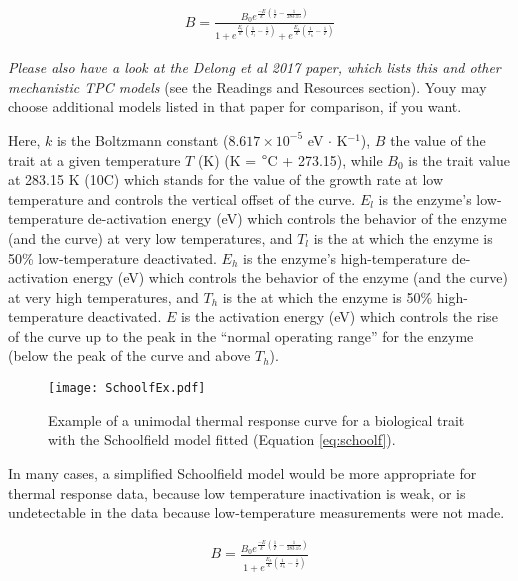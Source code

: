 \begin{equation} \label{eq:schoolf}
	\begin{aligned}
	  B = \frac{B_0 e^{\frac{-E}{k} (\frac{1}{T} - \frac{1}{283.15})}}
    { 1 + e^{\frac{E_l}{k} (\frac{1}{T_l} - \frac{1}{T})} + 
    e^{\frac{E_h}{k} (\frac{1}{T_h} - \frac{1}{T})}}
	\end{aligned}
\end{equation}

{\it Please also have a look at the Delong et al 2017 paper, which lists 
this and other mechanistic TPC models} (see the Readings and 
Resources section). Youy may choose additional models listed in that 
paper for comparison, if you want.

Here, $k$ is the Boltzmann constant ($8.617 \times 10^{-5}$ eV $\cdot$ 
K$^{-1}$), $B$ the value of the trait at a given temperature $T$ (K) (K 
= $\degree$C + 273.15), while $B_0$  is the trait value at 283.15 K 
(10\degree C) which stands for the value of the  growth rate at low 
temperature and controls the vertical offset of the curve. $E_l$ is the 
enzyme's low-temperature de-activation energy (eV) which controls the 
behavior of the enzyme (and the curve) at very low temperatures, and 
$T_l$ is the at which the enzyme is  50\% low-temperature deactivated. 
$E_h$ is the enzyme's high-temperature de-activation energy (eV) which 
controls the behavior of the enzyme (and the curve) at very high 
temperatures, and $T_h$ is the at which the enzyme is  50\% 
high-temperature deactivated. $E$ is  the activation energy (eV) which 
controls the rise of the curve up to the peak in the ``normal operating 
range'' for the enzyme (below the peak of the curve and above $T_h$). 

\begin{figure}\label{fig:schoolf}
		\centering \texttt{[image: SchoolfEx.pdf]} 
		\caption{Example of a unimodal thermal response curve for a 
		biological trait with the Schoolfield model fitted (Equation 
		\ref{eq:schoolf}).}
\end{figure}

In many cases, a simplified Schoolfield model would be more appropriate 
for thermal response data, because low temperature inactivation is 
weak, or is undetectable in the data because low-temperature 
measurements were not made.

\begin{equation} \label{eq:schoolfHi}
	\begin{aligned}
	  B = \frac{B_0 e^{\frac{-E}{k} (\frac{1}{T} - \frac{1}{283.15})}}
    { 1 +  e^{\frac{E_h}{k} (\frac{1}{T_h} - \frac{1}{T})}}
	\end{aligned}
\end{equation}

